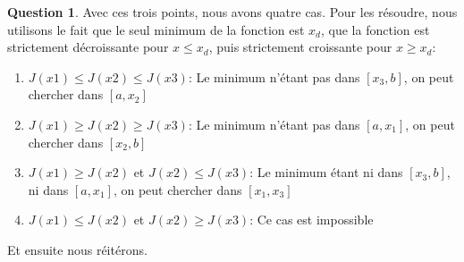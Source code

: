 \documentclass[a4paper]{article}
\theoremstyle{definition}
\newtheorem{que}{Question}
\begin{document}
	\setcounter{que}{10}
	\setcounter{que}{12}
	\begin{que}
		Avec ces trois points, nous avons quatre cas. Pour les résoudre, nous utilisons le fait que le seul minimum de la fonction est $x_d$, que la fonction est strictement décroissante pour $x \leq x_d$, puis strictement croissante pour $x \geq x_d$: \\
		\begin{enumerate}
			\item $J(x1) \leq J(x2) \leq J(x3)$: Le minimum n'étant pas dans $[x_3, b]$, on peut chercher dans $[a, x_2]$
			\item $J(x1) \geq J(x2) \geq J(x3)$:  Le minimum n'étant pas dans $[a, x_1]$, on peut chercher dans $[x_2, b]$
			\item $J(x1) \geq J(x2)$ et $J(x2) \leq J(x3)$: Le minimum étant ni dans $[x_3, b]$, ni dans $[a, x_1]$, on peut chercher dans $[x_1, x_3]$
			\item $J(x1) \leq J(x2)$ et $J(x2) \geq J(x3)$: Ce cas est impossible
		\end{enumerate}
		Et ensuite nous réitérons.
	\end{que}
\end{document}
